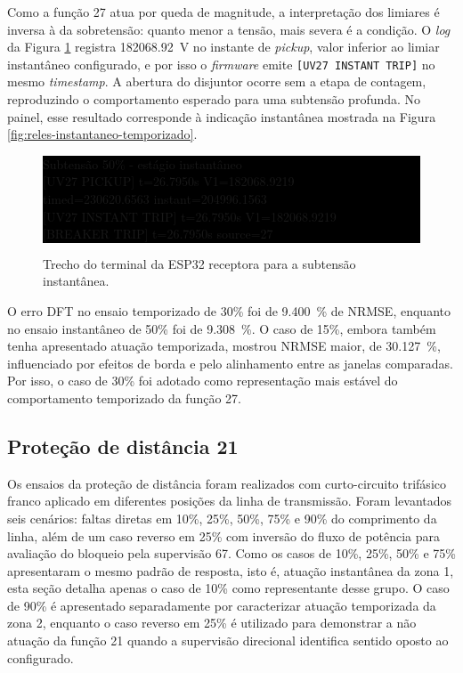 Como a função 27 atua por queda de magnitude, a interpretação dos limiares é inversa à da sobretensão: quanto menor a tensão, mais severa é a condição. O \textit{log} da Figura \ref{fig:log-subtensao-27i} registra \SI{182068,92}{\volt} no instante de \textit{pickup}, valor inferior ao limiar instantâneo configurado, e por isso o \textit{firmware} emite \texttt{[UV27 INSTANT TRIP]} no mesmo \textit{timestamp}. A abertura do disjuntor ocorre sem a etapa de contagem, reproduzindo o comportamento esperado para uma subtensão profunda. No painel, esse resultado corresponde à indicação instantânea mostrada na Figura \ref{fig:reles-instantaneo-temporizado}.

\begin{figure}[H]
  \centering
  \caption{Trecho do terminal da ESP32 receptora para a subtensão instantânea.}
  \label{fig:log-subtensao-27i}
  \begingroup
  \setlength{\fboxsep}{6pt}
  \colorbox{black}{%
    \begin{minipage}{0.90\textwidth}
      \color{white}\scriptsize\ttfamily
      Subtensão 50\% - estágio instantâneo\\
      {[UV27 PICKUP]} t=26.7950s V1=182068.9219\\
      \hspace*{1.8em}timed=230620.6563 instant=204996.1563\\
      {[UV27 INSTANT TRIP]} t=26.7950s V1=182068.9219\\
      {[BREAKER TRIP]} t=26.7950s source=27
    \end{minipage}
  }
  \endgroup
\end{figure}

O erro DFT no ensaio temporizado de 30\% foi de \SI{9,400}{\percent} de NRMSE, enquanto no ensaio instantâneo de 50\% foi de \SI{9,308}{\percent}. O caso de 15\%, embora também tenha apresentado atuação temporizada, mostrou NRMSE maior, de \SI{30,127}{\percent}, influenciado por efeitos de borda e pelo alinhamento entre as janelas comparadas. Por isso, o caso de 30\% foi adotado como representação mais estável do comportamento temporizado da função 27.

\subsection{Proteção de distância 21}

Os ensaios da proteção de distância foram realizados com curto-circuito trifásico franco aplicado em diferentes posições da linha de transmissão. Foram levantados seis cenários: faltas diretas em 10\%, 25\%, 50\%, 75\% e 90\% do comprimento da linha, além de um caso reverso em 25\% com inversão do fluxo de potência para avaliação do bloqueio pela supervisão 67. Como os casos de 10\%, 25\%, 50\% e 75\% apresentaram o mesmo padrão de resposta, isto é, atuação instantânea da zona 1, esta seção detalha apenas o caso de 10\% como representante desse grupo. O caso de 90\% é apresentado separadamente por caracterizar atuação temporizada da zona 2, enquanto o caso reverso em 25\% é utilizado para demonstrar a não atuação da função 21 quando a supervisão direcional identifica sentido oposto ao configurado.

